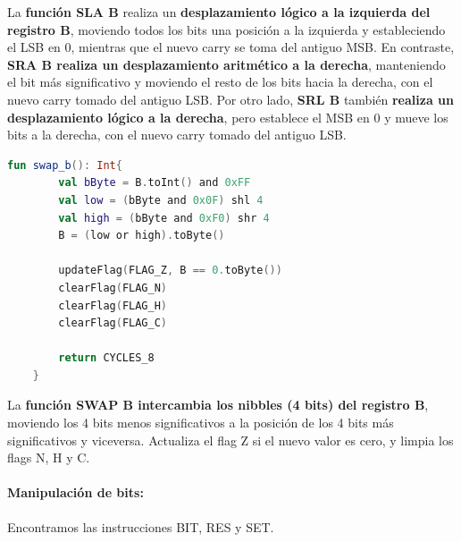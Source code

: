 La \textbf{función SLA B} realiza un \textbf{desplazamiento lógico a la izquierda del registro B}, moviendo todos los bits una posición a la izquierda y estableciendo el LSB en 0, mientras que el nuevo carry se toma del antiguo MSB. En contraste, \textbf{SRA B realiza un desplazamiento aritmético a la derecha}, manteniendo el bit más significativo y moviendo el resto de los bits hacia la derecha, con el nuevo carry tomado del antiguo LSB. Por otro lado, \textbf{SRL B} también \textbf{realiza un desplazamiento lógico a la derecha}, pero establece el MSB en 0 y mueve los bits a la derecha, con el nuevo carry tomado del antiguo LSB.

\begin{lstlisting}[language=Kotlin, caption={Operación SWAP}, label={code:kotlinswap}]
    fun swap_b(): Int{
        val bByte = B.toInt() and 0xFF
        val low = (bByte and 0x0F) shl 4
        val high = (bByte and 0xF0) shr 4
        B = (low or high).toByte()

        updateFlag(FLAG_Z, B == 0.toByte())
        clearFlag(FLAG_N)
        clearFlag(FLAG_H)
        clearFlag(FLAG_C)

        return CYCLES_8
    }
\end{lstlisting}

La \textbf{función SWAP B intercambia los nibbles (4 bits) del registro B}, moviendo los 4 bits menos significativos a la posición de los 4 bits más significativos y viceversa. Actualiza el flag Z si el nuevo valor es cero, y limpia los flags N, H y C.

\paragraph{Manipulación de bits:} Encontramos las instrucciones BIT, RES y SET.


